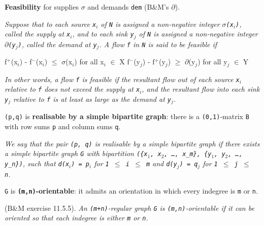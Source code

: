 \begin{definition}[IsFeasible]
\label{Networks.Network.IsFeasible}
\leanok
{}
\textbf{Feasibility} for supplies \texttt{$\sigma$} and demands \texttt{dem} (B\&M's
\texttt{$\partial$}).

\emph{Suppose that to each source \texttt{x$_{i}$} of \texttt{N}
is assigned a non-negative integer \texttt{$\sigma$(x$_{i}$)}, called the supply at
\texttt{x$_{i}$}, and to each
sink \texttt{y$_{j}$} of \texttt{N} is assigned a non-negative integer
\texttt{$\partial$(y$_{j}$)}, called the demand at
\texttt{y$_{j}$}.  A flow \texttt{f} in \texttt{N} is said to be feasible if}

f$^{+}$(x$_{i}$) - f$^{-}$(x$_{i}$) $\le$ $\sigma$(x$_{i}$)   for all x$_{i}$ $\in$ X
f$^{-}$(y$_{j}$) - f$^{+}$(y$_{j}$) $\ge$ $\partial$(y$_{j}$) for all y$_{j}$ $\in$ Y

\emph{In other words, a flow \texttt{f} is feasible if the resultant flow out of each
source
\texttt{x$_{i}$} relative to \texttt{f} does not exceed the supply at \texttt{x$_{i}$}, and the resultant flow into
each sink \texttt{y$_{j}$} relative to \texttt{f} is at least as large as the demand at
\texttt{y$_{j}$}.}
\end{definition}

\begin{definition}
\label{Networks.RealisableBipartite}
\leanok
\texttt{(p,q)} is \textbf{realisable by a simple bipartite graph}: there is a \texttt{(0,1)}-matrix \texttt{B} with row
sums \texttt{p} and column sums \texttt{q}.

\emph{We say that the pair \texttt{(p, q)} is
realisable by a simple bipartite graph if there exists a simple bipartite graph
\texttt{G}
with bipartition \texttt{(\{x$_{1}$, x$_{2}$, \dots{}, x\_m\}, \{y$_{1}$, y$_{2}$,
\dots{}, y\_n\})}, such that
\texttt{d(x$_{i}$) = p$_{i}$} for \texttt{1 $\le$ i $\le$ m} and \texttt{d(y$_{j}$) = q$_{j}$} for \texttt{1 $\le$ j $\le$ n}.}
\end{definition}

\begin{definition}
\label{Networks.IsOrientable}
\leanok
\texttt{G} is \textbf{\texttt{(m,n)}-orientable}: it admits an orientation in which every indegree is \texttt{m} or \texttt{n}.

(B\&M exercise 11.5.5). \emph{An \texttt{(m+n)}-regular graph \texttt{G} is
\texttt{(m,n)}-orientable if it can be oriented so that each indegree is either
\texttt{m} or \texttt{n}.}
\end{definition}

